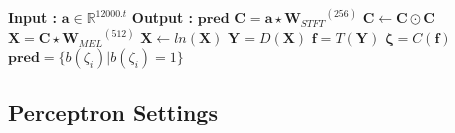 \begin{algorithm}
  \caption{$\textbf{pred}$ = $Model$($\textbf{a}$) }\label{exp:a1}
  \begin{algorithmic}[1]
    \Statex \textbf{Input :} $\textbf{a} \in \mathbb{R}^{12000.t}$
    \Statex \textbf{Output :} $\textbf{pred}$ 
    \State $\textbf{C} = \textbf{a} \star {\textbf{W}_{STFT}}^{(256)}$ 
    \State $\textbf{C} \leftarrow \textbf{C} \odot \textbf{C}$
    \State $\textbf{X} = \textbf{C} \star {\textbf{W}_{MEL}}^{(512)}$ 
    \State $\textbf{X} \leftarrow ln(\textbf{X})$
    \State $\textbf{Y} = D(\textbf{X})$ 
    \State $\textbf{f} = T(\textbf{Y})$ 
    \State $\bm{\zeta} = C(\textbf{f})$ 
    \State $\textbf{pred} = \{ b(\zeta_{i}) | b(\zeta_{i}) = 1 \}$ 
  \end{algorithmic}
\end{algorithm}
\FloatBarrier

\subsection{Perceptron Settings}


